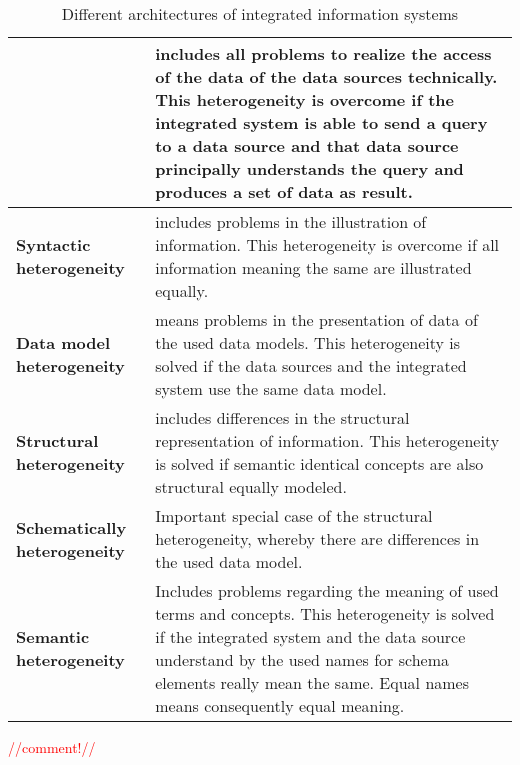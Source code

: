 \begin{table}[]
\centering
\caption{Different architectures of integrated information systems}
\label{architectures-of-integrated-information-systems}
\begin{tabular}{|l|p{}|}
\hline
 \textbf{}  &  includes all problems to realize the access of the data of the data sources technically. This heterogeneity is overcome if the integrated system is able to send a query to a data source and that data source principally understands the query and produces a set of data as result.\\ \hline
 \textbf{Syntactic  heterogeneity}    &  includes problems in the illustration of information. This heterogeneity is overcome if all information meaning the same are illustrated equally.\\ \hline
 \textbf{Data model  heterogeneity} &  means problems in the presentation of data of the used data models. This heterogeneity is solved if the data sources and the integrated system use the same data model.\\ \hline
 \textbf{Structural  heterogeneity}    &  includes differences in the structural representation of information. This heterogeneity is solved if semantic identical concepts are also structural equally modeled. \\ \hline
 \textbf{Schematically  heterogeneity} &  Important special case of the structural heterogeneity, whereby there are differences in the used data model.\\ \hline
 \textbf{Semantic  heterogeneity}    &  Includes problems regarding the meaning of used terms and concepts. This heterogeneity is solved if the integrated system and the data source understand by the used names for schema elements really mean the same. Equal names means consequently equal meaning.\\ \hline
\end{tabular}
\end{table}



\textcolor{red}{//comment!//}